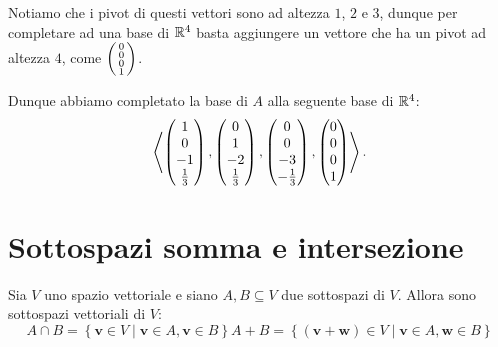\begin{solution}
    Notiamo che i pivot di questi vettori sono ad altezza $1$, $2$ e $3$, dunque per completare ad una base di $\mathbb{R}^4$ basta aggiungere un vettore che ha un pivot ad altezza $4$, come $\begin{psmallmatrix} 0\\0\\0\\1 \end{psmallmatrix}$.

    Dunque abbiamo completato la base di $A$ alla seguente base di $\mathbb{R}^4$: \[
        \left\langle 
            \begin{pmatrix}1\\0\\-1\\\frac13 \end{pmatrix}, 
            \begin{pmatrix}0\\1\\-2\\\frac13 \end{pmatrix}, 
            \begin{pmatrix}0\\0\\-3\\-\frac13 \end{pmatrix},
            \begin{pmatrix} 0\\0\\0\\1 \end{pmatrix}
         \right\rangle.      
    \]
\end{solution}

\section{Sottospazi somma e intersezione}

\begin{definition}
    Sia $V$ uno spazio vettoriale e siano $A, B \subseteq V$ due sottospazi di $V$. Allora sono sottospazi vettoriali di $V$:
    \begin{subequations}
        \begin{equation}
            A \cap B = \left\{ \bm{v} \in V \mid \bm v \in A, \bm v \in B\right\}
        \end{equation}
        \begin{equation}
            A + B = \left\{ (\bm{v} + \bm{w}) \in V \mid \bm v \in A, \bm w \in B\right\}
        \end{equation}
    \end{subequations}
\end{definition}

